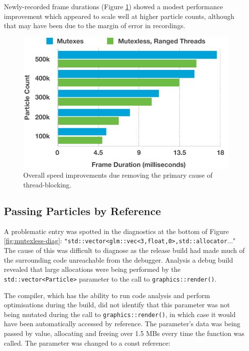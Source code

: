 \documentclass[11pt, a4paper, twocolumn]{article}
\begin{document}
Newly-recorded frame durations (Figure \ref{fig:mutexes-rangedthreads}) showed a modest performance improvement which appeared to scale well at higher particle counts, although that may have been due to the margin of error in recordings.

\begin{figure}[h]
\includegraphics[width=\linewidth]{mutexes-rangedthreads}
\caption{Overall speed improvements due removing the primary cause of thread-blocking.}
\label{fig:mutexes-rangedthreads}
\end{figure}

\subsection{Passing Particles by Reference} \label{sec:passby}

A problematic entry was spotted in the diagnostics at the bottom of Figure \ref{fig:mutexless-diag}: \verb|"std::vector<|\linebreak[0]\verb|glm::vec<3,float,0>,|\linebreak[0]\verb|std::allocator|..." The cause of this was difficult to diagnose as the release build had made much of the surrounding code unreachable from the debugger. Analysis a debug build revealed that large allocations were being performed by the \verb|std::vector<Particle>| parameter to the call to \verb|graphics::render()|.

The compiler, which has the ability to run code analysis and perform optimisations during the build, did not identify that this parameter was not being mutated during the call to \verb|graphics::render()|, in which case it would have been automatically accessed by reference. The parameter's data was being passed by value, allocating and freeing over 1.5 MBs every time the function was called. The parameter was changed to a const reference:
\end{document}
